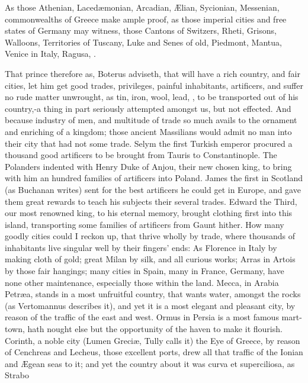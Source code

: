 {As those Athenian, Laced\ae{}monian, Arcadian, \AE{}lian, Sycionian,
Messenian, \etc{} commonwealths of Greece make ample proof, as those
imperial cities and free states of Germany may witness, those Cantons
of Switzers, Rheti, Grisons, Walloons, Territories of Tuscany, Luke and
Senes of old, Piedmont, Mantua, Venice in Italy, Ragusa, \etc{}.

That prince therefore as, Boterus adviseth, that will have a rich
country, and fair cities, let him get good trades, privileges, painful
inhabitants, artificers, and suffer no rude matter unwrought, as tin,
iron, wool, lead, \etc{}, to be transported out of his country,-a
thing in part seriously attempted amongst us, but not effected. And
because industry of men, and multitude of trade so much avails to the
ornament and enriching of a kingdom; those ancient Massilians
would admit no man into their city that had not some trade. Selym the
first Turkish emperor procured a thousand good artificers to be brought
from Tauris to Constantinople. The Polanders indented with Henry Duke
of Anjou, their new chosen king, to bring with him an hundred families
of artificers into Poland. James the first in Scotland (as
Buchanan writes) sent for the best artificers he could get in
Europe, and gave them great rewards to teach his subjects their several
trades. Edward the Third, our most renowned king, to his eternal
memory, brought clothing first into this island, transporting some
families of artificers from Gaunt hither. How many goodly cities could
I reckon up, that thrive wholly by trade, where thousands of
inhabitants live singular well by their fingers' ends: As Florence in
Italy by making cloth of gold; great Milan by silk, and all curious
works; Arras in Artois by those fair hangings; many cities in Spain,
many in France, Germany, have none other maintenance, especially those
within the land. Mecca, in Arabia Petr\ae{}a, stands in a most
unfruitful country, that wants water, amongst the rocks (as Vertomannus
describes it), and yet it is a most elegant and pleasant city, by
reason of the traffic of the east and west. Ormus in Persia is a most
famous mart-town, hath nought else but the opportunity of the haven to
make it flourish. Corinth, a noble city (Lumen Greci\ae{}, Tully calls it)
the Eye of Greece, by reason of Cenchreas and Lecheus, those excellent
ports, drew all that traffic of the Ionian and \AE{}gean seas to it; and
yet the country about it was curva et superciliosa, as Strabo
}
